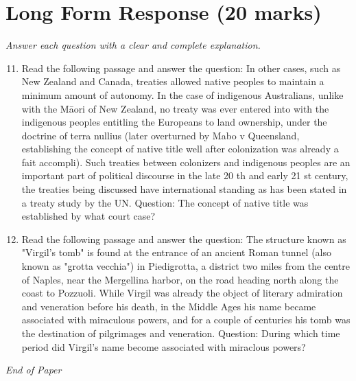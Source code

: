 \documentclass[12pt]{article}
\begin{document}
\section*{Long Form Response (20 marks)}
\textit{Answer each question with a clear and complete explanation.}
\begin{enumerate}[label=\arabic*.]
\setcounter{enumi}{10}
\item Read the following passage and answer the question: In other cases, such as New Zealand and Canada, treaties allowed native peoples to maintain a minimum amount of autonomy. In the case of indigenous Australians, unlike with the Māori of New Zealand, no treaty was ever entered into with the indigenous peoples entitling the Europeans to land ownership, under the doctrine of terra nullius (later overturned by Mabo v Queensland, establishing the concept of native title well after colonization was already a fait accompli). Such treaties between colonizers and indigenous peoples are an important part of political discourse in the late 20 th and early 21 st century, the treaties being discussed have international standing as has been stated in a treaty study by the UN. Question: The concept of native title was established by what court case?
\item Read the following passage and answer the question: The structure known as "Virgil's tomb" is found at the entrance of an ancient Roman tunnel (also known as "grotta vecchia") in Piedigrotta, a district two miles from the centre of Naples, near the Mergellina harbor, on the road heading north along the coast to Pozzuoli. While Virgil was already the object of literary admiration and veneration before his death, in the Middle Ages his name became associated with miraculous powers, and for a couple of centuries his tomb was the destination of pilgrimages and veneration. Question: During which time period did Virgil's name become associated with miraclous powers?
\end{enumerate}

\vfill
\noindent\textit{End of Paper}
\end{document}
